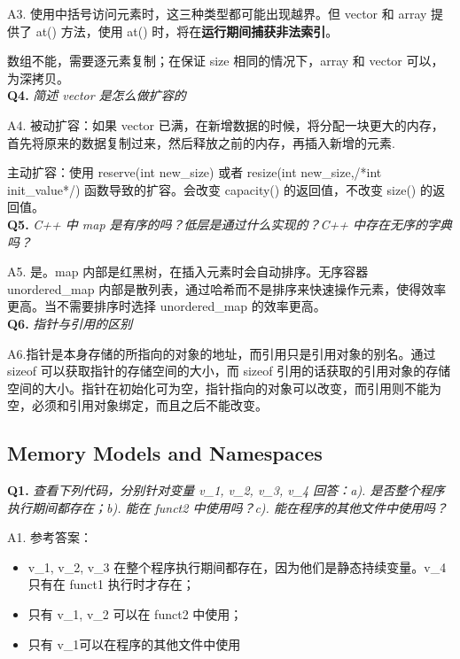 \documentclass[cn,10pt,math=newtx,citestyle=gb7714-2015,bibstyle=gb7714-2015]{elegantbook}
\begin{document}
A3. 使用中括号访问元素时，这三种类型都可能出现越界。但 vector 和 array 提供了 at() 方法，使用 at() 时，将在\textbf{运行期间捕获非法索引}。

数组不能，需要逐元素复制；在保证 size 相同的情况下，array 和 vector 可以，为深拷贝。\\


\textbf{Q4.} \textit{简述 vector 是怎么做扩容的}

A4. 被动扩容：如果 vector 已满，在新增数据的时候，将分配一块更大的内存，首先将原来的数据复制过来，然后释放之前的内存，再插入新增的元素.

主动扩容：使用 reserve(int new\_size) 或者 resize(int new\_size,/*int init\_value*/) 函数导致的扩容。会改变 capacity() 的返回值，不改变 size() 的返回值。\\


\textbf{Q5.} \textit{C++ 中 map 是有序的吗？低层是通过什么实现的？C++ 中存在无序的字典吗？}

A5. 是。map 内部是红黑树，在插入元素时会自动排序。无序容器 unordered\_map 内部是散列表，通过哈希而不是排序来快速操作元素，使得效率更高。当不需要排序时选择 unordered\_map 的效率更高。\\


\textbf{Q6.} \textit{指针与引用的区别}

A6.指针是本身存储的所指向的对象的地址，而引用只是引用对象的别名。通过 sizeof 可以获取指针的存储空间的大小，而 sizeof 引用的话获取的引用对象的存储空间的大小。指针在初始化可为空，指针指向的对象可以改变，而引用则不能为空，必须和引用对象绑定，而且之后不能改变。\\


\subsection{Memory Models and Namespaces}

\textbf{Q1.} \textit{查看下列代码，分别针对变量 v\_1, v\_2, v\_3, v\_4 回答：a). 是否整个程序执行期间都存在；b). 能在 funct2 中使用吗？c). 能在程序的其他文件中使用吗？}

A1. 参考答案：

\begin{itemize}
  \item v\_1, v\_2, v\_3 在整个程序执行期间都存在，因为他们是静态持续变量。v\_4 只有在 funct1 执行时才存在；
  \item 只有 v\_1, v\_2 可以在 funct2 中使用；
  \item 只有 v\_1可以在程序的其他文件中使用\\
\end{itemize}
\end{document}
